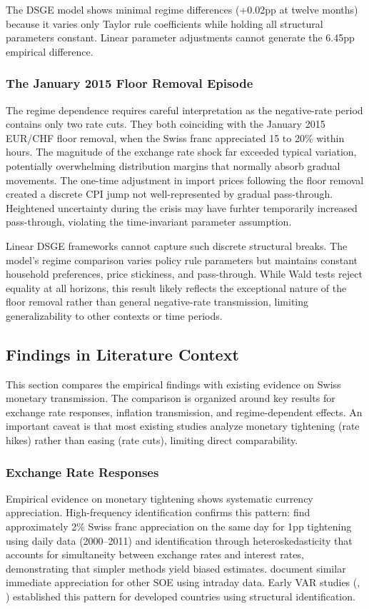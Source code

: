 \documentclass[12pt,a4paper]{article}
\begin{document}
The DSGE model shows minimal regime differences (+0.02pp at twelve months) because it varies only Taylor rule coefficients while holding all structural parameters constant. Linear parameter adjustments cannot generate the 6.45pp empirical difference.

\subsubsection{The January 2015 Floor Removal Episode}
The regime dependence requires careful interpretation as the negative-rate period contains only two rate cuts. They both coinciding with the January 2015 EUR/CHF floor removal, when the Swiss franc appreciated 15 to 20\% within hours. The magnitude of the exchange rate shock far exceeded typical variation, potentially overwhelming distribution margins that normally absorb gradual movements. The one-time adjustment in import prices following the floor removal created a discrete CPI jump not well-represented by gradual pass-through. Heightened uncertainty during the crisis may have furhter temporarily increased pass-through, violating the time-invariant parameter assumption.

Linear DSGE frameworks cannot capture such discrete structural breaks. The model's regime comparison varies policy rule parameters but maintains constant household preferences, price stickiness, and pass-through. While Wald tests reject equality at all horizons, this result likely reflects the exceptional nature of the floor removal rather than general negative-rate transmission, limiting generalizability to other contexts or time periods.

\subsection{Findings in Literature Context}
\label{subsec:literature_comparison}
This section compares the empirical findings with existing evidence on Swiss 
monetary transmission. The comparison is organized around key results for exchange rate responses, inflation transmission, and regime-dependent effects. An important caveat is that most existing studies analyze monetary tightening (rate hikes) rather than easing (rate cuts), limiting direct comparability.

\subsubsection{Exchange Rate Responses}
Empirical evidence on monetary tightening shows systematic currency appreciation. High-frequency identification confirms this pattern: \citet{fink2024} find approximately 2\% Swiss franc appreciation on the same day for 1pp tightening using daily data (2000--2011) and identification through heteroskedasticity that accounts for simultaneity between exchange rates and interest rates, demonstrating that simpler methods yield biased estimates. \citet{kearns2006} document similar immediate appreciation for other SOE using intraday data. Early VAR studies (\citealt{eichenbaum1995}, \citealt{kim2000}) established this pattern for developed countries using structural identification.
\end{document}
